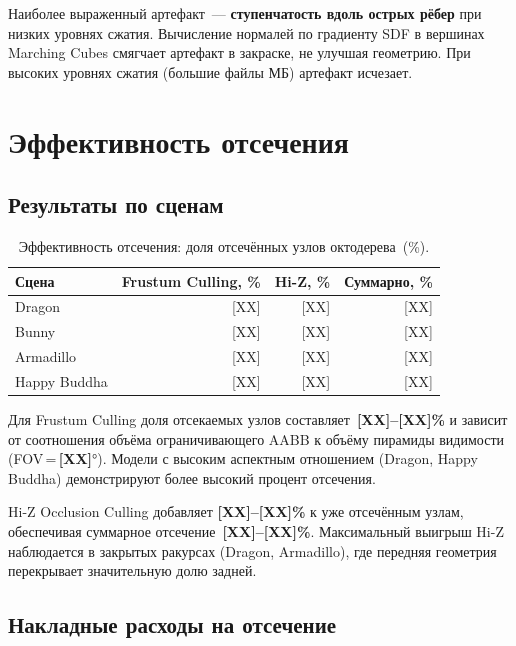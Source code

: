 Наиболее выраженный артефакт~--- \textbf{ступенчатость вдоль острых рёбер}
при низких уровнях сжатия. Вычисление нормалей по градиенту SDF в вершинах
Marching Cubes смягчает артефакт в закраске, не улучшая геометрию.
При высоких уровнях сжатия (большие файлы МБ) артефакт исчезает.

\section{Эффективность отсечения}
\label{sec:culling}

\subsection{Результаты по сценам}

\begin{table}[h]
  \centering
  \caption{Эффективность отсечения: доля отсечённых узлов октодерева~(\%).}
  \label{tab:culling_efficiency}
  \begin{tabular}{lrrr}
    \toprule
    \textbf{Сцена}
      & \textbf{Frustum Culling, \%}
      & \textbf{Hi-Z, \%}
      & \textbf{Суммарно, \%} \\
    \midrule
    Dragon       & [XX] & [XX] & [XX] \\
    Bunny        & [XX] & [XX] & [XX] \\
    Armadillo    & [XX] & [XX] & [XX] \\
    Happy Buddha & [XX] & [XX] & [XX] \\
    \bottomrule
  \end{tabular}
\end{table}

Для Frustum Culling доля отсекаемых узлов составляет~\textbf{[XX]--[XX]\%}
и зависит от соотношения объёма ограничивающего AABB к объёму пирамиды
видимости (FOV\,=\,\textbf{[XX]}°). Модели с высоким аспектным отношением
(Dragon, Happy Buddha) демонстрируют более высокий процент отсечения.

Hi-Z Occlusion Culling добавляет \textbf{[XX]--[XX]\%} к уже отсечённым
узлам, обеспечивая суммарное отсечение~\textbf{[XX]--[XX]\%}.
Максимальный выигрыш Hi-Z наблюдается в закрытых ракурсах (Dragon,
Armadillo), где передняя геометрия перекрывает значительную долю задней.

\subsection{Накладные расходы на отсечение}


